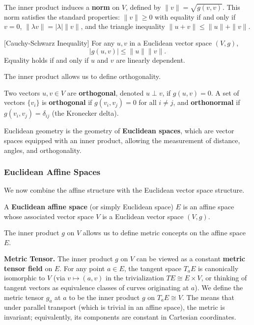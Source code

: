 The inner product induces a \textbf{norm} on $V$, defined by $\|v\| = \sqrt{g(v, v)}$. This norm satisfies the standard properties: $\|v\| \ge 0$ with equality if and only if $v = 0$, $\|\lambda v\| = |\lambda| \|v\|$, and the triangle inequality $\|u + v\| \le \|u\| + \|v\|$.

\begin{proposition} \label{prop:cauchy_schwarz}[Cauchy-Schwarz Inequality]
For any $u, v$ in a Euclidean vector space $(V, g)$,
\[
|g(u, v)| \le \|u\| \|v\|.
\]
Equality holds if and only if $u$ and $v$ are linearly dependent.
\end{proposition}

The inner product allows us to define orthogonality.

\begin{definition}[Orthogonality] \label{def:orthogonality}
Two vectors $u, v \in V$ are \textbf{orthogonal}, denoted $u \perp v$, if $g(u, v) = 0$. A set of vectors $\{v_i\}$ is \textbf{orthogonal} if $g(v_i, v_j) = 0$ for all $i \neq j$, and \textbf{orthonormal} if $g(v_i, v_j) = \delta_{ij}$ (the Kronecker delta).
\end{definition}

Euclidean geometry is the geometry of \textbf{Euclidean spaces}, which are vector spaces equipped with an inner product, allowing the measurement of distance, angles, and orthogonality.


\subsubsection{Euclidean Affine Spaces}

We now combine the affine structure with the Euclidean vector space structure.

\begin{definition} \label{def:euclidean_space}
A \textbf{Euclidean affine space} (or simply Euclidean space) $E$ is an affine space whose associated vector space $V$ is a Euclidean vector space $(V, g)$.
\end{definition}

The inner product $g$ on $V$ allows us to define metric concepts on the affine space $E$.

\textbf{Metric Tensor.} The inner product $g$ on $V$ can be viewed as a constant \textbf{metric tensor field} on $E$. For any point $a \in E$, the tangent space $T_a E$ is canonically isomorphic to $V$ (via $v \mapsto (a, v)$ in the trivialization $TE \cong E \times V$, or thinking of tangent vectors as equivalence classes of curves originating at $a$). We define the metric tensor $g_a$ at $a$ to be the inner product $g$ on $T_a E \cong V$. The  means that under parallel transport (which is trivial in an affine space), the metric is invariant; equivalently, its components are constant in Cartesian coordinates.

